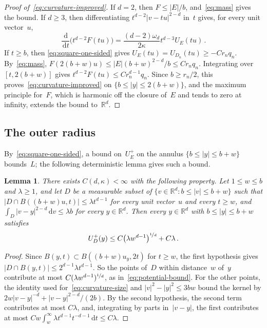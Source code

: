 \documentclass[11pt]{amsart}
\theoremstyle{plain}
\newtheorem{lemma}[theorem]{Lemma}
\theoremstyle{definition}
\newcommand{\R}{\mathbb R}
\newcommand{\drift}{\kappa}
\newcommand{\dd}{\,\mathrm d}
\newcommand{\nf}{\nicefrac}
\numberwithin{equation}{section}
\begin{document}
\begin{proof}[Proof of~\eqref{eq:curvature-improved}]
If $d=2$, then $F\leq|E|/b$, and~\eqref{eq:mass} gives the bound. If $d\geq3$, then differentiating $t^{d-2}|v-tu|^{2-d}$ in~$t$ gives, for every unit vector~$u$,
\begin{equation*}
\frac{\dd}{\dd t}\bigl(t^{d-2}F(tu)\bigr)=\frac{(d-2)\omega_d}{2\drift}t^{d-3}U_E(tu)\, .
\end{equation*}
If $t\geq b$, then \eqref{eq:square-one-sided} gives $U_E(tu)=U_{D_n}(tu)\geq-Cr_nq_n$. By~\eqref{eq:mass}, $F(2(b+w)u)\leq|E|(b+w)^{2-d}/b\leq Cr_nq_n$. Integrating over $[t,2(b+w)]$ gives $t^{d-2}F(tu)\leq Cr_n^{d-1}q_n$. Since $b\geq r_n/2$, this proves~\eqref{eq:curvature-improved} on $\{b\leq|y|\leq2(b+w)\}$, and the maximum principle for~$F$, which is harmonic off the closure of~$E$ and tends to zero at infinity, extends the bound to~$\R^d$.
\end{proof}

\subsection{The outer radius}

By~\eqref{eq:square-one-sided}, a bound on~$U_E^+$ on the annulus $\{b\leq|y|\leq b+w\}$ bounds~$L$; the following deterministic lemma gives such a bound.

\begin{lemma}\label{lem:near-far}
There exists $C(d,\drift)<\infty$ with the following property. Let $1\leq w\leq b$ and $\lambda\geq1$, and let $D$ be a measurable subset of $\{v\in\R^d:b\leq|v|\leq b+w\}$ such that $|D\cap B((b+w)u,t)|\leq\lambda t^{d-1}$ for every unit vector~$u$ and every $t\geq w$, and $\int_D|v-y|^{2-d}\dd v\leq\lambda b$ for every $y\in\R^d$. Then every $y\in\R^d$ with $b\leq|y|\leq b+w$ satisfies
\begin{equation*}
U_D^+(y)\leq C\bigl(\lambda w^{d-1}\bigr)^{\nf1d}+C\lambda\, .
\end{equation*}
\end{lemma}

\begin{proof}
Since $B(y,t)\subset B((b+w)u_y,2t)$ for $t\geq w$, the first hypothesis gives $|D\cap B(y,t)|\leq2^{d-1}\lambda t^{d-1}$. So the points of~$D$ within distance~$w$ of~$y$ contribute at most $C(\lambda w^{d-1})^{\nf1d}$, as in~\eqref{eq:potential-bound}. For the other points, the identity used for~\eqref{eq:curvature-size} and $|v|^2-|y|^2\leq3bw$ bound the kernel by $2w|v-y|^{-d}+|v-y|^{2-d}/(2b)$. By the second hypothesis, the second term contributes at most $C\lambda$, and, integrating by parts in~$|v-y|$, the first contributes at most $Cw\int_w^\infty\lambda t^{d-1}t^{-d-1}\dd t\leq C\lambda$.
\end{proof}
\end{document}
